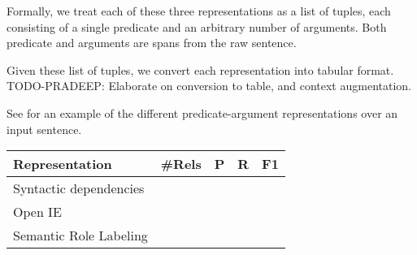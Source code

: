 Formally, we treat each of these three representations as a list of tuples, each
consisting of a single predicate and an arbitrary number of arguments. Both
predicate and arguments are spans from the raw sentence.

Given these list of tuples, we convert each representation into tabular format.
TODO-PRADEEP: Elaborate on conversion to table, and context augmentation.

See  for an example of the different predicate-argument
representations over an input sentence.


\begin{table}[]
\begin{tabular}{@{}lllll@{}}
\toprule
Representation         & \#Rels & P & R & F1 \\ \midrule
Syntactic dependencies &             &           &        &    \\
Open IE                &             &           &        &    \\
Semantic Role Labeling  &             &           &        &    \\ \bottomrule
\end{tabular}
\end{table}
